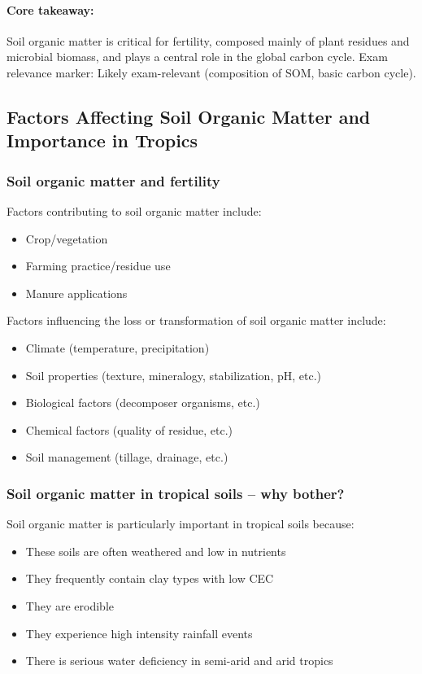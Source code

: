 \paragraph*{Core takeaway:} 
Soil organic matter is critical for fertility, composed mainly of plant residues and microbial biomass, and plays a central role in the global carbon cycle. Exam relevance marker: Likely exam-relevant (composition of SOM, basic carbon cycle).

\subsection{Factors Affecting Soil Organic Matter and Importance in Tropics} 
\subsubsection{Soil organic matter and fertility}  
Factors contributing to soil organic matter include: 

\begin{itemize} 
    \item Crop/vegetation 
    \item Farming practice/residue use 
    \item Manure applications 
\end{itemize}

Factors influencing the loss or transformation of soil organic matter include: 

\begin{itemize} 
    \item Climate (temperature, precipitation) 
    \item Soil properties (texture, mineralogy, stabilization, pH, etc.) 
    \item Biological factors (decomposer organisms, etc.) 
    \item Chemical factors (quality of residue, etc.) 
    \item Soil management (tillage, drainage, etc.) 
\end{itemize}

\subsubsection{Soil organic matter in tropical soils – why bother?} Soil organic matter is particularly important in tropical soils because: 

\begin{itemize} 
    \item These soils are often weathered and low in nutrients 
    \item They frequently contain clay types with low CEC \item They are erodible 
    \item They experience high intensity rainfall events 
    \item There is serious water deficiency in semi-arid and arid tropics 
\end{itemize}


